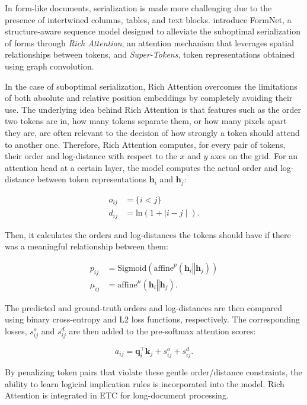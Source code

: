 In form-like documents, serialization is made more challenging due to the presence of intertwined columns, tables, and text blocks. \citet{lee2022formnet} introduce FormNet, a structure-aware sequence model designed to alleviate the suboptimal serialization of forms through \textit{Rich Attention}, an attention mechanism that leverages spatial relationships between tokens, and \textit{Super-Tokens}, token representations obtained using graph convolution. 

In the case of suboptimal serialization, Rich Attention overcomes the limitations of both absolute and relative position embeddings by completely avoiding their use. The underlying idea behind Rich Attention is that features such as the order two tokens are in, how many tokens separate them, or how many pixels apart they are, are often relevant to the decision of how strongly a token should attend to another one. Therefore, Rich Attention computes, for every pair of tokens, their order and log-distance with respect to the $x$ and $y$ axes on the grid. For an attention head at a certain layer, the model computes the actual order and log-distance between token representations $\bm{h}_i$ and $\bm{h}_j$:

\begin{align}
    o_{ij} &= \{i < j\} \\
    d_{ij} &= \text{ln}(1 + \mid i - j \mid).
\end{align}

\noindent Then, it calculates the  orders and log-distances the tokens should have if there was a meaningful relationship between them:

\begin{align}
    p_{ij} &= \text{Sigmoid}\left(\text{affine}^p(\bm{h}_i \mathbin\Vert \bm{h}_j)\right)\\
    \mu_{ij} &= \text{affine}^{\mu}(\bm{h}_i \mathbin\Vert \bm{h}_j).
\end{align}

\noindent The predicted and ground-truth orders and log-distances are then compared using binary cross-entropy and L2 loss functions, respectively. The corresponding losses, $s^{o}_{ij}$ and $s^{d}_{ij}$ are then added to the pre-softmax attention scores:

\begin{equation}
    a_{ij} = \bm{q}_i^{\top} \bm{k}_j + s^{o}_{ij} + s^{d}_{ij}.
\end{equation}

\noindent By penalizing token pairs that violate these gentle order/distance constraints, the ability to learn logicial implication rules is incorporated into the model. Rich Attention is integrated in \ac{ETC} for long-document processing.

